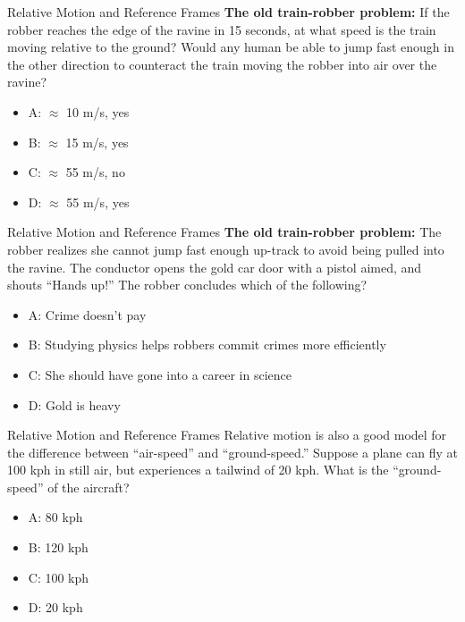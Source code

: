\documentclass{beamer}
\begin{document}
\begin{frame}{Relative Motion and Reference Frames}
\small 
\textbf{The old train-robber problem:} If the robber reaches the edge of the ravine in 15 seconds, at what speed is the train moving relative to the ground?  Would any human be able to jump fast enough in the other direction to counteract the train moving the robber into air over the ravine?\\
\begin{itemize}
\item A: $\approx$ 10 m/s, yes
\item B: $\approx$ 15 m/s, yes
\item C: $\approx$ 55 m/s, no
\item D: $\approx$ 55 m/s, yes
\end{itemize}
\end{frame}

\begin{frame}{Relative Motion and Reference Frames}
\small 
\textbf{The old train-robber problem:} The robber realizes she cannot jump fast enough up-track to avoid being pulled into the ravine.  The conductor opens the gold car door with a pistol aimed, and shouts ``Hands up!''  The robber concludes which of the following?  \\
\begin{itemize}
\item A: Crime doesn't pay
\item B: Studying physics helps robbers commit crimes more efficiently
\item C: She should have gone into a career in science
\item D: Gold is heavy
\end{itemize}
\end{frame}

\begin{frame}{Relative Motion and Reference Frames}
\small
Relative motion is also a good model for the difference between ``air-speed'' and ``ground-speed.''  Suppose a plane can fly at 100 kph in still air, but experiences a tailwind of 20 kph.  What is the ``ground-speed'' of the aircraft?
\begin{itemize}
\item A: 80 kph
\item B: 120 kph
\item C: 100 kph
\item D: 20 kph
\end{itemize}
\end{frame}
\end{document}
